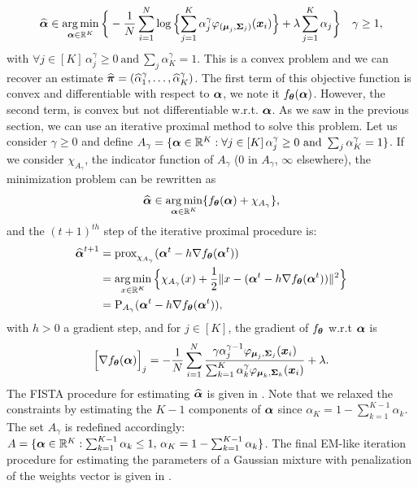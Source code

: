 \begin{equation}
\widehat{\boldsymbol \alpha}\in\operatorname*{arg\,min}_{\boldsymbol \alpha\in {\mathbb R}^{K}}\bigg\{
-\frac{1}{N}\sum_{i=1}^{N}\log\Big\{{\sum_{j=1}^K\alpha^\gamma_j\varphi_{(\boldsymbol\mu_{j},\boldsymbol\Sigma_{j})}(\boldsymbol x_i)}\Big\}+\lambda\sum_{j=1}^{K}\alpha_j \color{black} \bigg\}\quad \gamma\geq1,  
\end{equation}
with  $\forall j \in[K]\, \alpha_j^\gamma \geq0\ \text{and}\ \sum_{j}\alpha^\gamma_{K}=1$. This is a convex problem and we can recover an estimate $\widehat{\boldsymbol \pi}=(\widehat\alpha_1^{\gamma},\dots,\widehat\alpha_K^{\gamma})$. The first term of this objective function is convex and differentiable with respect to $\boldsymbol \alpha$, we note it $f_{\boldsymbol\theta}(\boldsymbol \alpha)$. However, the second term, is convex but not differentiable w.r.t. $\boldsymbol \alpha$. As we saw in the previous section, we can use an iterative proximal method to solve this problem. Let us consider $\gamma\geq 0$ and define $A_{\gamma}=\{\balpha\in\RR^K: \forall j \in[K]\, \alpha_j^\gamma \geq0\ \text{and}\ \sum_{j}\alpha^\gamma_{K}=1 \}$. If we consider {\large$\chi_{A_{\gamma}}$}, the indicator function of $A_{\gamma}$ ($0$ in $A_{\gamma}$, $\infty$ elsewhere), the minimization problem can be rewritten as
\begin{equation}
  \widehat{\boldsymbol \alpha}\in\operatorname*{arg\,min}_{\boldsymbol \alpha\in{\mathbb R}^{K}}\{ f_{\boldsymbol\theta}(\boldsymbol \alpha) + \chi_{A_{\gamma}}  \},
\end{equation}
and the $(t+1)^{th}$ step of the iterative proximal procedure is:
\begin{align}
\widehat{\boldsymbol \alpha}^{t+1}
&={\text{prox}}_{\chi_{A_{\gamma}}}( \boldsymbol \alpha^t - h \nabla f_{{\boldsymbol\theta}}(\boldsymbol \alpha^t)  )\\
&=\operatorname*{arg\,min}_{x\in{\mathbb R}^{K}}\Big\{ \chi_{A_{\gamma}}(x) + \frac{1}{2}\|x-(\boldsymbol \alpha^t - h \nabla f_{{\boldsymbol\theta}}(\boldsymbol \alpha^t)) \|^2 \Big\}\\
&=\textnormal{P}_{A_{\gamma}}(\boldsymbol \alpha^t - h \nabla f_{{\boldsymbol\theta}}(\boldsymbol \alpha^t) ),
\end{align}
with $h>0$ a gradient step, and for $j\in[K]$, the gradient of $f_{{\boldsymbol\theta}}$ w.r.t $\boldsymbol \alpha$ is
\begin{equation}
  \Big[\nabla f_{{\boldsymbol\theta}}(\boldsymbol \alpha)\Big]_{j} = -\frac{1}{N}\sum_{i=1}^N\frac{\gamma\alpha_j^{\gamma-1}\varphi_{\boldsymbol\mu_j,\boldsymbol\Sigma_j}(\boldsymbol x_i)}{\sum_{k=1}^K\alpha_k^{\gamma}\varphi_{\boldsymbol\mu_k,\boldsymbol\Sigma_k}(\boldsymbol x_i)}+\lambda.
\end{equation}
The FISTA procedure for estimating $\widehat{\boldsymbol \alpha}$ is given in . Note that we relaxed the constraints by estimating the $K-1$ components of $\boldsymbol \alpha$ since $\alpha_K=1-\sum_{k=1}^{K-1}\alpha_k$. The set $A_{\gamma}$ is redefined accordingly: $A=\{\boldsymbol \alpha\in{\mathbb R}^{K}: \sum_{k=1}^{K-1}\alpha_k\leq1,\, \alpha_K=1-\sum_{k=1}^{K-1}\alpha_k\}$. The final EM-like iteration procedure for estimating the parameters of a Gaussian mixture with penalization of the weights vector is given in .
